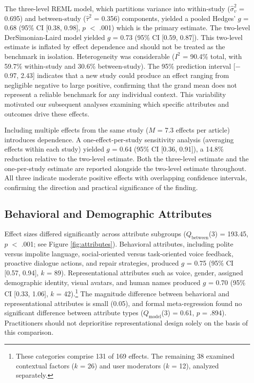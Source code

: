 \documentclass[lettersize,journal]{IEEEtran}
\begin{document}
The three-level REML model, which partitions variance into within-study ($\hat{\sigma}^2_v$ = 0.695) and between-study ($\hat{\tau}^2$ = 0.356) components, yielded a pooled Hedges' $g$ = 0.68 (95\% CI [0.38, 0.98], $p$ $<$ .001) which is the primary estimate. The two-level DerSimonian-Laird model yielded $g$ = 0.73 (95\% CI [0.59, 0.87]). This two-level estimate is inflated by effect dependence and should not be treated as the benchmark in isolation. Heterogeneity was considerable ($I^2$ = 90.4\% total, with 59.7\% within-study and 30.6\% between-study). The 95\% prediction interval [$-$0.97, 2.43] indicates that a new study could produce an effect ranging from negligible negative to large positive, confirming that the grand mean does not represent a reliable benchmark for any individual context. This variability motivated our subsequent analyses examining which specific attributes and outcomes drive these effects.

Including multiple effects from the same study ($M$ = 7.3 effects per article) introduces dependence. A one-effect-per-study sensitivity analysis (averaging effects within each study) yielded $g$ = 0.64 (95\% CI [0.36, 0.91]), a 14.8\% reduction relative to the two-level estimate. Both the three-level estimate and the one-per-study estimate are reported alongside the two-level estimate throughout. All three indicate moderate positive effects with overlapping confidence intervals, confirming the direction and practical significance of the finding.

\subsection{Behavioral and Demographic Attributes} \label{sec:beh}

Effect sizes differed significantly across attribute subgroups ($Q_{\text{between}}$(3) = 193.45, $p$ $<$ .001; see Figure \ref{fig:attributes}). Behavioral attributes, including polite versus impolite language, social-oriented versus task-oriented voice feedback, proactive dialogue actions, and repair strategies, produced $g$ = 0.75 (95\% CI [0.57, 0.94], $k$ = 89). Representational attributes such as voice, gender, assigned demographic identity, visual avatars, and human names produced $g$ = 0.70 (95\% CI [0.33, 1.06], $k$ = 42).\footnote{These categories comprise 131 of 169 effects. The remaining 38 examined contextual factors ($k$ = 26) and user moderators ($k$ = 12), analyzed separately.} The magnitude difference between behavioral and representational attributes is small (0.05), and formal meta-regression found no significant difference between attribute types ($Q_{\text{model}}$(3) = 0.61, $p$ = .894). Practitioners should not deprioritise representational design solely on the basis of this comparison.
\end{document}
